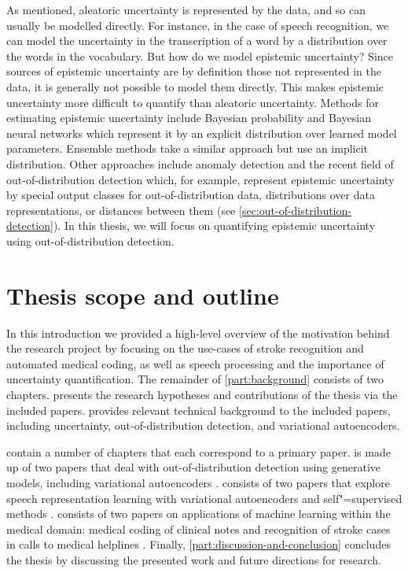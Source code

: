 As mentioned, aleatoric uncertainty is represented by the data, and so can usually be modelled directly. For instance, in the case of speech recognition, we can model the uncertainty in the transcription of a word by a distribution over the words in the vocabulary. But how do we model epistemic uncertainty? 
Since sources of epistemic uncertainty are by definition those not represented in the data, it is generally not possible to model them directly. This makes epistemic uncertainty more difficult to quantify than aleatoric uncertainty. 
Methods for estimating epistemic uncertainty include Bayesian probability and Bayesian neural networks \parencite{mackay_practical_1992, neal_bayesian_1995} which represent it by an explicit distribution over learned model parameters. Ensemble methods \parencite{gal_dropout_2016,lakshminarayanan_simple_2017} take a similar approach but use an implicit distribution. 
Other approaches include anomaly detection and the recent field of out-of-distribution detection which, for example, represent epistemic uncertainty by special output classes for out-of-distribution data, distributions over data representations, or distances between them (see \cref{sec:out-of-distribution-detection}). In this thesis, we will focus on quantifying epistemic uncertainty using out-of-distribution detection. 


\section{Thesis scope and outline}

In this introduction we provided a high-level overview of the motivation behind the research project by focusing on the use-cases of stroke recognition and automated medical coding, as well as speech processing and the importance of uncertainty quantification. 
The remainder of \cref{part:background} consists of two chapters. 
 presents the research hypotheses and contributions of the thesis via the included papers. 
 provides relevant technical background to the included papers, including uncertainty, out-of-distribution detection, and variational autoencoders. 

 contain a number of chapters that each correspond to a primary paper. 
 is made up of two papers that deal with out-of-distribution detection using generative models, including variational autoencoders \parencite{havtorn_hierarchical_2021,bergamin_modelagnostic_2022}. 
 consists of two papers that explore speech representation learning with variational autoencoders and self"=supervised methods \parencite{borgholt_brief_2022,havtorn_benchmarking_2022}. 
 consists of two papers on applications of machine learning within the medical domain: medical coding of clinical notes \parencite{edin_automated_2023} and recognition of stroke cases in calls to medical helplines \parencite{wenstrup_retrospective_2023}. 
Finally, \cref{part:discussion-and-conclusion} concludes the thesis by discussing the presented work and future directions for research.
